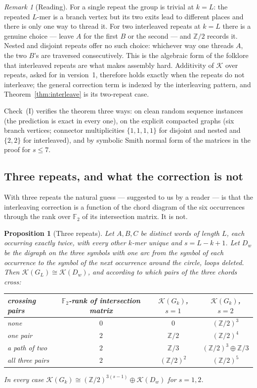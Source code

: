 \documentclass[11pt]{article}
\theoremstyle{plain}
\newtheorem{proposition}[theorem]{Proposition}
\theoremstyle{definition}
\theoremstyle{remark}
\newtheorem{remark}[theorem]{Remark}
\newcommand{\Z}{\mathbb{Z}}
\newcommand{\K}{\mathcal{K}}
\begin{document}
\begin{remark}[Reading]\label{rem:reading}
For a single repeat the group is trivial at $k=L$: the repeated $L$-mer is a branch vertex
but its two exits lead to different places and there is only one way to thread it. For
two interleaved repeats at $k=L$ there is a genuine choice --- leave $A$ for the first $B$
or the second --- and $\Z/2$ records it. Nested and disjoint repeats offer no such
choice: whichever way one threads $A$, the two $B$'s are traversed consecutively. This is
the algebraic form of the folklore that interleaved repeats are what makes assembly hard.
Additivity of $\K$ over repeats, asked for in version~1, therefore holds exactly when the
repeats do not interleave; the general correction term is indexed by the interleaving
pattern, and Theorem~\ref{thm:interleave} is its two-repeat case.
\end{remark}

Check~(I) verifies the theorem three ways: on clean random sequence instances (the
prediction is exact in every one), on the explicit compacted graphs (six branch vertices;
connector multiplicities $\{1,1,1,1\}$ for disjoint and nested and $\{2,2\}$ for
interleaved), and by symbolic Smith normal form of the matrices in the proof for
$s\le7$.

\subsection*{Three repeats, and what the correction is not}

With three repeats the natural guess --- suggested to us by a reader --- is that the
interleaving correction is a function of the chord diagram of the six occurrences through
the rank over $\mathbb F_2$ of its intersection matrix. It is not.

\begin{proposition}[Three repeats]\label{prop:three}
Let $A,B,C$ be distinct words of length $L$, each occurring exactly twice, with every other
$k$-mer unique and $s=L-k+1$. Let $D_w$ be the digraph on the three symbols with one arc
from the symbol of each occurrence to the symbol of the next occurrence around the circle,
loops deleted. Then $\K(G_L)\cong\K(D_w)$, and according to which pairs of the three chords
cross:
\begin{center}\small
\begin{tabular}{lccc}
\toprule
crossing pairs & $\mathbb F_2$-rank of intersection matrix & $\K(G_k)$, $s=1$ & $\K(G_k)$, $s=2$\\
\midrule
none            & $0$ & $0$            & $(\Z/2)^{3}$\\
one pair        & $2$ & $\Z/2$         & $(\Z/2)^{4}$\\
a path of two   & $2$ & $\Z/3$         & $(\Z/2)^{3}\oplus\Z/3$\\
all three pairs & $2$ & $(\Z/2)^{2}$   & $(\Z/2)^{5}$\\
\bottomrule
\end{tabular}
\end{center}
In every case $\K(G_k)\cong(\Z/2)^{3(s-1)}\oplus\K(D_w)$ for $s=1,2$.
\end{proposition}
\end{document}
